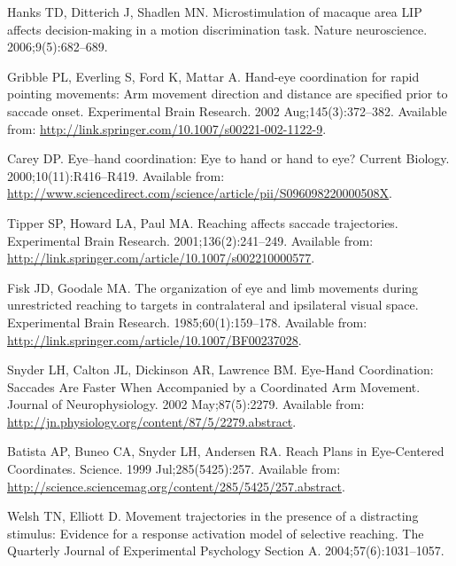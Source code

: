 \documentclass[10pt,letterpaper]{article}
\begin{document}
\begin{thebibliography}{10}
Hanks TD, Ditterich J, Shadlen MN.
\newblock Microstimulation of macaque area {LIP} affects decision-making in a
  motion discrimination task.
\newblock Nature neuroscience. 2006;9(5):682--689.

Gribble PL, Everling S, Ford K, Mattar A.
\newblock Hand-eye coordination for rapid pointing movements: {Arm} movement
  direction and distance are specified prior to saccade onset.
\newblock Experimental Brain Research. 2002 Aug;145(3):372--382.
\newblock Available from:
  \url{http://link.springer.com/10.1007/s00221-002-1122-9}.

Carey DP.
\newblock Eye–hand coordination: {Eye} to hand or hand to eye?
\newblock Current Biology. 2000;10(11):R416--R419.
\newblock Available from:
  \url{http://www.sciencedirect.com/science/article/pii/S096098220000508X}.

Tipper SP, Howard LA, Paul MA.
\newblock Reaching affects saccade trajectories.
\newblock Experimental Brain Research. 2001;136(2):241--249.
\newblock Available from:
  \url{http://link.springer.com/article/10.1007/s002210000577}.

Fisk JD, Goodale MA.
\newblock The organization of eye and limb movements during unrestricted
  reaching to targets in contralateral and ipsilateral visual space.
\newblock Experimental Brain Research. 1985;60(1):159--178.
\newblock Available from:
  \url{http://link.springer.com/article/10.1007/BF00237028}.

Snyder LH, Calton JL, Dickinson AR, Lawrence BM.
\newblock Eye-{Hand} {Coordination}: {Saccades} {Are} {Faster} {When}
  {Accompanied} by a {Coordinated} {Arm} {Movement}.
\newblock Journal of Neurophysiology. 2002 May;87(5):2279.
\newblock Available from:
  \url{http://jn.physiology.org/content/87/5/2279.abstract}.

Batista AP, Buneo CA, Snyder LH, Andersen RA.
\newblock Reach {Plans} in {Eye}-{Centered} {Coordinates}.
\newblock Science. 1999 Jul;285(5425):257.
\newblock Available from:
  \url{http://science.sciencemag.org/content/285/5425/257.abstract}.

Welsh TN, Elliott D.
\newblock Movement trajectories in the presence of a distracting stimulus:
  {Evidence} for a response activation model of selective reaching.
\newblock The Quarterly Journal of Experimental Psychology Section A.
  2004;57(6):1031--1057.


\end{thebibliography}
\end{document}
